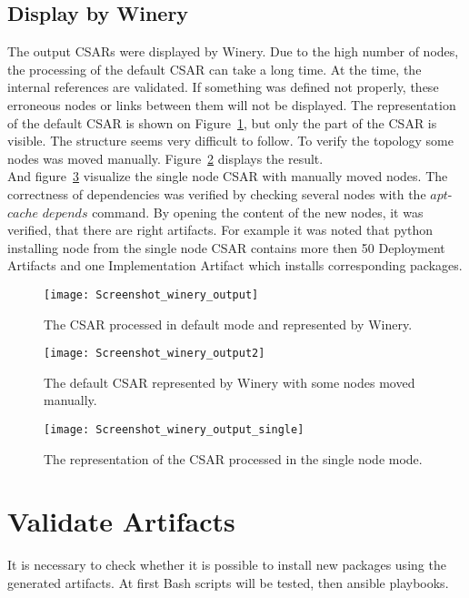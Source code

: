  \subsection*{Display by Winery}
 The output CSARs were displayed by Winery.
Due to the high number of nodes, the processing of the default CSAR can take a long time. 
 At the time, the  internal references are validated.
 If something was defined not properly, these erroneous nodes or links between them will not be displayed.
The representation of the default CSAR is shown on Figure~\ref{fig:winery_output}, but only the part of the CSAR is visible.
 The structure seems very difficult to follow.
 To verify the topology some nodes was moved manually. 
 Figure~\ref{fig:winery_output2} displays the result. \\
 And figure~\ref{fig:winery_output_single} visualize the single node CSAR with manually moved nodes. 
 The correctness of dependencies was verified by checking several nodes with the $apt$-$cache$ $depends$ command.
 By opening the content of the new nodes, it was verified, that there are right artifacts.
 For example it was noted that python installing node from the single node CSAR contains more then 50 Deployment Artifacts and one Implementation Artifact which installs corresponding packages.
 \begin{figure}[ht]   
 	\centering
 	\texttt{[image: Screenshot\_winery\_output]}  
 	\caption{The CSAR processed in default mode and represented by Winery.}
 	\label{fig:winery_output}
 \end{figure}
 \begin{figure}[ht]   
 	\centering
 	\texttt{[image: Screenshot\_winery\_output2]}
 	\caption{The default CSAR represented by Winery with some nodes moved manually.}
 	\label{fig:winery_output2}
 \end{figure}
\begin{figure}[ht]   
	\centering
	\texttt{[image: Screenshot\_winery\_output\_single]}
	\caption{The representation of the CSAR processed in the single node mode.}
	\label{fig:winery_output_single}
\end{figure}
\section{Validate Artifacts}\label{sec:checkart}
It is necessary to check whether it is possible to install new packages using the generated artifacts.
At first Bash scripts will be tested, then ansible playbooks.

